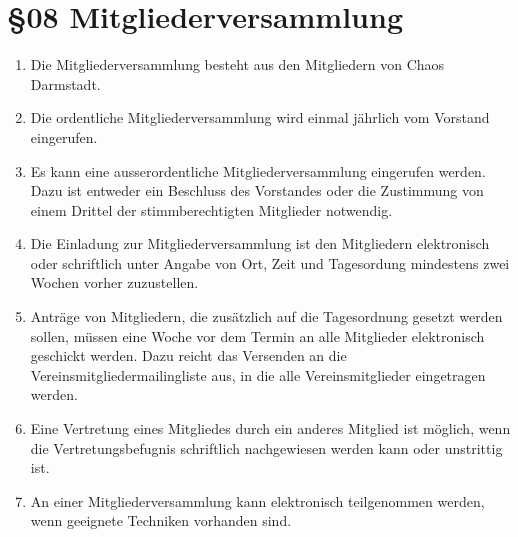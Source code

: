 \section*{§08 Mitgliederversammlung}
\begin{enumerate}
\item Die Mitgliederversammlung besteht aus den Mitgliedern von Chaos Darmstadt.
\item Die ordentliche Mitgliederversammlung wird einmal jährlich vom Vorstand
eingerufen.
\item Es kann eine ausserordentliche Mitgliederversammlung eingerufen werden.
Dazu ist entweder ein Beschluss des Vorstandes oder die Zustimmung
von einem Drittel der stimmberechtigten Mitglieder notwendig.
\item Die Einladung zur Mitgliederversammlung ist den Mitgliedern elektronisch
oder schriftlich unter Angabe von Ort, Zeit und Tagesordung mindestens
zwei Wochen vorher zuzustellen.
\item Anträge von Mitgliedern, die zusätzlich auf die Tagesordnung gesetzt
werden sollen, müssen eine Woche vor dem Termin an alle Mitglieder
elektronisch geschickt werden. Dazu reicht das Versenden an die Vereinsmitgliedermailingliste
aus, in die alle Vereinsmitglieder eingetragen werden.
\item Eine Vertretung eines Mitgliedes durch ein anderes Mitglied ist möglich,
wenn die Vertretungsbefugnis schriftlich nachgewiesen werden kann
oder unstrittig ist.
\item An einer Mitgliederversammlung kann elektronisch teilgenommen werden,
wenn geeignete Techniken vorhanden sind.
\end{enumerate}
